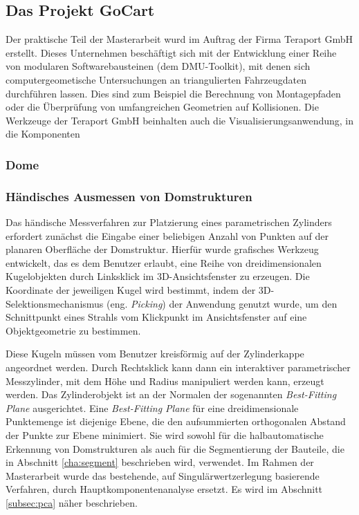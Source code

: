 \subsection{Das Projekt GoCart}
\label{goCart}

Der praktische Teil der Masterarbeit wurd im Auftrag der Firma Teraport GmbH erstellt. Dieses Unternehmen besch\"aftigt sich mit der Entwicklung einer Reihe von modularen Softwarebausteinen (dem DMU-Toolkit), mit denen sich computergeometische Untersuchungen an triangulierten Fahrzeugdaten durchf\"uhren lassen. Dies sind zum Beispiel die Berechnung von Montagepfaden oder die \"Uberpr\"ufung von umfangreichen Geometrien auf Kollisionen. Die Werkzeuge der Teraport GmbH beinhalten auch die Visualisierungsanwendung, in die Komponenten


\subsubsection{Dome}
\label{dome}


\subsubsection{H\"andisches Ausmessen von Domstrukturen}
\label{domeMeasure}

Das h\"andische Messverfahren zur Platzierung eines parametrischen Zylinders erfordert zun\"achst die Eingabe einer beliebigen Anzahl von Punkten auf der planaren Oberfl\"ache der Domstruktur. Hierf\"ur wurde grafisches Werkzeug entwickelt, das es dem Benutzer erlaubt, eine Reihe von dreidimensionalen Kugelobjekten durch Linksklick im 3D-Ansichtsfenster zu erzeugen. Die Koordinate der jeweiligen Kugel wird bestimmt, indem der 3D-Selektionsmechanismus (eng. \textit{Picking}) der Anwendung genutzt wurde, um den Schnittpunkt eines Strahls vom Klickpunkt im Ansichtsfenster auf eine Objektgeometrie zu bestimmen.

Diese Kugeln m\"ussen vom Benutzer kreisf\"ormig auf der Zylinderkappe angeordnet werden. Durch Rechtsklick kann dann ein interaktiver parametrischer Messzylinder, mit dem H\"ohe und Radius manipuliert werden kann, erzeugt werden. Das Zylinderobjekt ist an der Normalen der sogenannten \textit{Best-Fitting Plane} ausgerichtet. Eine \textit{Best-Fitting Plane} f\"ur eine dreidimensionale Punktemenge ist diejenige Ebene, die den aufsummierten orthogonalen Abstand der Punkte zur Ebene minimiert. Sie wird sowohl f\"ur die halbautomatische Erkennung von Domstrukturen als auch f\"ur die Segmentierung der Bauteile, die in Abschnitt \ref{cha:segment} beschrieben wird, verwendet. Im Rahmen der Masterarbeit wurde das bestehende, auf Singulärwertzerlegung basierende Verfahren, durch Hauptkomponentenanalyse ersetzt. Es wird im Abschnitt \ref{subsec:pca} näher beschrieben.


